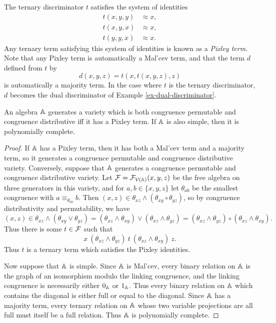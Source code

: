 \documentclass[letterpaper,11pt]{article}
\begin{document}
The ternary discriminator $t$ satisfies the system of identities
\begin{align*}
t(x,y,y) &\approx x,\\
t(x,y,x) &\approx x,\\
t(y,y,x) &\approx x.
\end{align*}
Any ternary term satisfying this system of identities is known as a \emph{Pixley term}. Note that any Pixley term is automatically a Mal'cev term, and that the term $d$ defined from $t$ by
\[
d(x,y,z) = t(x,t(x,y,z),z)
\]
is automatically a majority term. In the case where $t$ is the ternary discriminator, $d$ becomes the dual discriminator of Example \ref{ex-dual-discriminator}.

\begin{thm}\label{pixley-poly} An algebra $\mathbb{A}$ generates a variety which is both congruence permutable and congruence distributive iff it has a Pixley term. If $\mathbb{A}$ is also simple, then it is polynomially complete.
\end{thm}
\begin{proof} If $\mathbb{A}$ has a Pixley term, then it has both a Mal'cev term and a majority term, so it generates a congruence permutable and congruence distributive variety. Conversely, suppose that $\mathbb{A}$ generates a congruence permutable and congruence distributive variety. Let $\mathcal{F} = \mathcal{F}_{\mathcal{V}(\mathbb{A})}(x,y,z)$ be the free algebra on three generators in this variety, and for $a,b \in \{x,y,z\}$ let $\theta_{ab}$ be the smallest congruence with $a \equiv_{\theta_{ab}} b$. Then $(x,z) \in \theta_{xz} \wedge (\theta_{xy} \circ \theta_{yz})$, so by congruence distributivity and permutability, we have
\[
(x,z) \in \theta_{xz} \wedge (\theta_{xy} \vee \theta_{yz}) = (\theta_{xz} \wedge \theta_{xy}) \vee (\theta_{xz} \wedge \theta_{yz}) = (\theta_{xz} \wedge \theta_{yz}) \circ (\theta_{xz} \wedge \theta_{xy}).
\]
Thus there is some $t \in \mathcal{F}$ such that
\[
x\ (\theta_{xz} \wedge \theta_{yz})\ t\ (\theta_{xz} \wedge \theta_{xy})\ z.
\]
Thus $t$ is a ternary term which satisfies the Pixley identities.

Now suppose that $\mathbb{A}$ is simple. Since $\mathbb{A}$ is Mal'cev, every binary relation on $\mathbb{A}$ is the graph of an isomorphism modulo the linking congruence, and the linking congruence is necessarily either $0_{\mathbb{A}}$ or $1_{\mathbb{A}}$. Thus every binary relation on $\mathbb{A}$ which contains the diagonal is either full or equal to the diagonal. Since $\mathbb{A}$ has a majority term, every ternary relation on $\mathbb{A}$ whose two variable projections are all full must itself be a full relation. Thus $\mathbb{A}$ is polynomially complete.
\end{proof}
\end{document}
